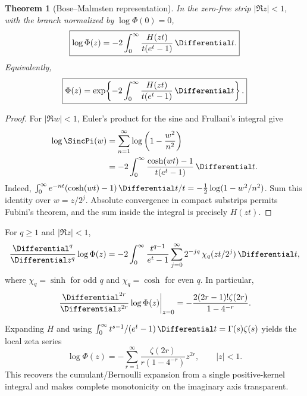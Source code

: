 \documentclass[11pt]{article}
\newtheorem{theorem}{Theorem}[section]
\theoremstyle{definition}
\theoremstyle{remark}
\begin{document}
\begin{theorem}[Bose--Malmsten representation]
\label{p6:thm:malmsten}
In the zero-free strip \(|\Re z|<1\), with the branch normalized by
\(\log\Phi(0)=0\),
\begin{equation}
\boxed{
 \log\Phi(z)
 =-2\int_0^\infty
   \frac{H(zt)}{t(e^t-1)}\,\Differential t.}                         \label{p6:eq:logPhi-malmsten}
\end{equation}
Equivalently,
\begin{equation}
\boxed{
 \Phi(z)=\exp\!\left\{-2\int_0^\infty
   \frac{H(zt)}{t(e^t-1)}\,\Differential t\right\}.}               \label{p6:eq:Phi-product-integral}
\end{equation}
\end{theorem}

\begin{proof}
For \(|\Re w|<1\), Euler's product for the sine and Frullani's integral give
\begin{align*}
 \log\SincPi(w)
 &=\sum_{n=1}^{\infty}\log\left(1-\frac{w^2}{n^2}\right)\\
 &=-2\int_0^\infty
   \frac{\cosh(wt)-1}{t(e^t-1)}\,\Differential t.
\end{align*}
Indeed,
\(
 \int_0^\infty e^{-nt}(\cosh(wt)-1)\,\Differential t/t
 =-\tfrac12\log(1-w^2/n^2)
\).
Sum this identity over \(w=z/2^j\).  Absolute convergence in compact
substrips permits Fubini's theorem, and the sum inside the integral is precisely
\(H(zt)\).
\end{proof}

\begin{corollary}
\label{p6:cor:malmsten-derivatives}
For \(q\ge1\) and \(|\Re z|<1\),
\begin{equation}
 \frac{\Differential^q}{\Differential z^q}\log\Phi(z)
 =-2\int_0^\infty\frac{t^{q-1}}{e^t-1}
   \sum_{j=0}^{\infty}2^{-jq}\,\chi_q(zt/2^j)\,\Differential t,      \label{p6:eq:logPhi-deriv-integral}
\end{equation}
where \(\chi_q=\sinh\) for odd \(q\) and \(\chi_q=\cosh\) for even \(q\).
In particular,
\begin{equation}
 \left.\frac{\Differential^{2r}}{\Differential z^{2r}}\log\Phi(z)\right|_{z=0}
 =-\frac{2(2r-1)!\zeta(2r)}{1-4^{-r}}.                    \label{p6:eq:logPhi-even-jet}
\end{equation}
\end{corollary}

Expanding \(H\) and using
\(\int_0^\infty t^{s-1}/(e^t-1)\,\Differential t=\Gamma(s)\zeta(s)\)
yields the local zeta series
\begin{equation}
 \log\Phi(z)
 =-\sum_{r=1}^{\infty}
   \frac{\zeta(2r)}{r(1-4^{-r})}z^{2r},
 \qquad |z|<1.                                             \label{p6:eq:logPhi-zeta-series}
\end{equation}
This recovers the cumulant/Bernoulli expansion from a single positive-kernel integral and
makes complete monotonicity on the imaginary axis transparent.
\end{document}
